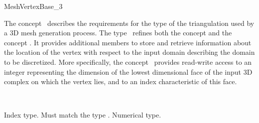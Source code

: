 \ccRefPageBegin


\begin{ccRefConcept}{MeshVertexBase_3}


\ccDefinition
  
The concept \ccRefName\ describes the  requirements 
for the  type  of the triangulation
used by a 3D mesh generation process. The type \ccRefName\
refines both the concept 
and 
 the concept .
It provides additional members  to store and retrieve
information about the location of the vertex with respect 
to the input domain describing the domain to be discretized.
More specifically, the concept \ccRefName\ provides  read-write access 
to an integer representing the dimension of the lowest dimensional face
of the input 3D complex on which the  vertex lies,
and to an index characteristic of this face.


\ccRefines
{}\\

\ccTypes

{Index type. Must match the type .}
{Numerical type.}


\ccOperations

\ccGlue
{}


\end{ccRefConcept}
